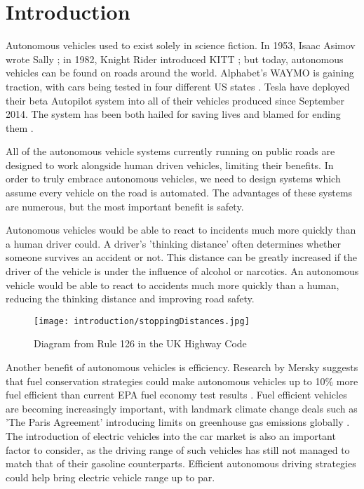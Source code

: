 \chapter{Introduction}
\label{cha:Introduction}

Autonomous vehicles used to exist solely in science fiction. In 1953, Isaac Asimov wrote Sally \citep{Asimov1953}; in 1982, Knight Rider introduced KITT \citep{Kitt1982}; but today, autonomous vehicles can be found on roads around the world. Alphabet's WAYMO is gaining traction, with cars being tested in four different US states \citep{Waymo2016}. Tesla have deployed their beta Autopilot system into all of their vehicles produced since September 2014. The system has been both hailed for saving lives and blamed for ending them \citep{TeslaHospital} \citep{TeslaUnderInvestigation}.

All of the autonomous vehicle systems currently running on public roads are designed to work alongside human driven vehicles, limiting their benefits. In order to truly embrace autonomous vehicles, we need to design systems which assume every vehicle on the road is automated. The advantages of these systems are numerous, but the most important benefit is safety.

Autonomous vehicles would be able to react to incidents much more quickly than a human driver could. A driver's 'thinking distance' often determines whether someone survives an accident or not. This distance can be greatly increased if the driver of the vehicle is under the influence of alcohol or narcotics. An autonomous vehicle would be able to react to accidents much more quickly than a human, reducing the thinking distance and improving road safety.

\begin{figure}[htb]
\texttt{[image: introduction/stoppingDistances.jpg]}
\caption{Diagram from Rule 126 in the UK Highway Code \citep{StoppingDistances}}
\label{fig:StoppingDistances}
\end{figure}

Another benefit of autonomous vehicles is efficiency. Research by Mersky suggests that fuel conservation strategies could make autonomous vehicles up to 10\% more fuel efficient than current EPA fuel economy test results \citep{Mersky2016}. Fuel efficient vehicles are becoming increasingly important, with landmark climate change deals such as 'The Paris Agreement' introducing limits on greenhouse gas emissions globally \citep{Paris2016}. The introduction of electric vehicles into the car market is also an important factor to consider, as the driving range of such vehicles has still not managed to match that of their gasoline counterparts. Efficient autonomous driving strategies could help bring electric vehicle range up to par.

